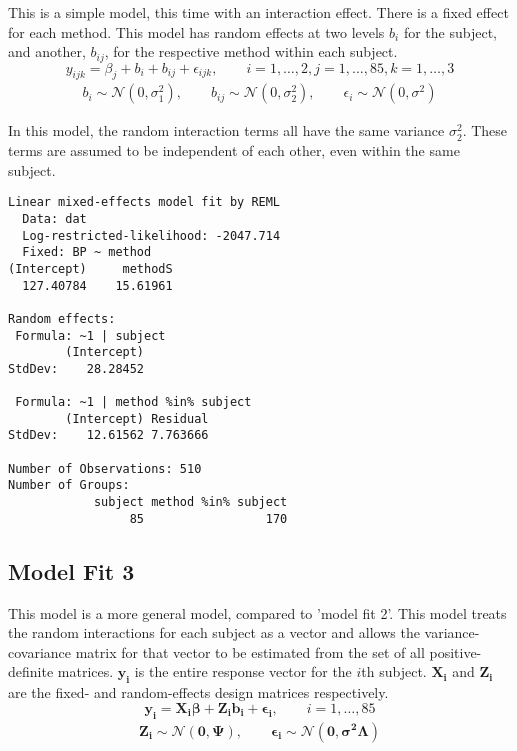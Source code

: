 \documentclass[12pt, a4paper]{article}
\begin{document}
This is a simple model, this time with an interaction effect.
There is a fixed effect for each method. This model has random effects at two levels $b_{i}$ for the subject, and
another, $b_{ij}$, for the respective method within each subject.
\begin{equation*}
y_{ijk} = \beta_{j}  + b_{i} + b_{ij} + \epsilon_{ijk}, \qquad i=1,\dots,2, j=1,\dots,85, k=1,\dots,3
\end{equation*}
\begin{eqnarray*}
b_{i} \sim \mathcal{N}(0,\sigma^2_{1}), \qquad b_{ij} \sim \mathcal{N}(0,\sigma^2_{2}), \qquad \epsilon_{i} \sim \mathcal{N}(0,\sigma^2)
\end{eqnarray*}

In this model, the random interaction terms all have the same variance $\sigma^2_{2}$. These terms are assumed to be independent of each other, even
within the same subject.

\begin{verbatim}
Linear mixed-effects model fit by REML
  Data: dat
  Log-restricted-likelihood: -2047.714
  Fixed: BP ~ method
(Intercept)     methodS
  127.40784    15.61961

Random effects:
 Formula: ~1 | subject
        (Intercept)
StdDev:    28.28452

 Formula: ~1 | method %in% subject
        (Intercept) Residual
StdDev:    12.61562 7.763666

Number of Observations: 510
Number of Groups:
            subject method %in% subject
                 85                 170
\end{verbatim}


\newpage
\subsection{Model Fit 3}

This model is a more general model, compared to 'model fit 2'. This model treats the random interactions for each subject as a vector and
allows the variance-covariance matrix for that vector to be estimated from the set of all positive-definite matrices.
$\boldsymbol{y_{i}}$ is the entire response vector for the $i$th subject.
$\boldsymbol{X_{i}}$ and $\boldsymbol{Z_{i}}$  are the fixed- and random-effects design matrices respectively.
\begin{equation*}
\boldsymbol{y_{i}} = \boldsymbol{X_{i}\beta}  + \boldsymbol{Z_{i}b_{i}} + \boldsymbol{\epsilon_{i}}, \qquad i=1,\dots,85
\end{equation*}
\begin{eqnarray*}
\boldsymbol{Z_{i}} \sim \mathcal{N}(\boldsymbol{0,\Psi}),\qquad
\boldsymbol{\epsilon_{i}} \sim \mathcal{N}(\boldsymbol{0,\sigma^2\Lambda})
\end{eqnarray*}
\end{document}
